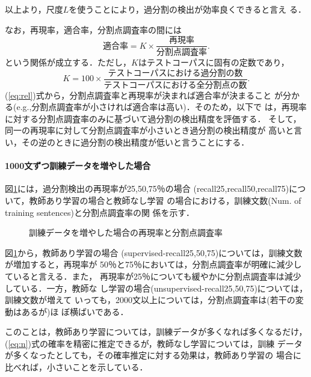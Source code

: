 以上より，尺度$L$を使うことにより，過分割の検出が効率良くできると言え
る．

なお，再現率，適合率，分割点調査率の間には
\begin{equation}
  \label{eq:rel}
  適合率  = K \times \frac{再現率}{分割点調査率}.
\end{equation}
という関係が成立する．ただし，$K$はテストコーパスに固有の定数であり，
\begin{displaymath}
K = 100 \times \frac{テストコーパスにおける過分割の数}{テストコーパスにおける全分割点の数}.
\end{displaymath}
(\ref{eq:rel})式から，分割点調査率と再現率が決まれば適合率が決まること
が分かる(e.g.,分割点調査率が小さければ適合率は高い)．そのため，以下で
は，再現率に対する分割点調査率のみに基づいて過分割の検出精度を評価する．
そして，同一の再現率に対して分割点調査率が小さいとき過分割の検出精度が
高いと言い，その逆のときに過分割の検出精度が低いと言うことにする．

\paragraph{1000文ずつ訓練データを増やした場合}

図\ref{fig:incr-exam}には，過分割検出の再現率が25,50,75％の場合
(recall25,recall50,recall75)について，教師あり学習の場合と教師なし学習
の場合における，訓練文数(Num. of training sentences)と分割点調査率の関
係を示す．


\begin{figure}[htbp]
  \begin{center}
\vspace{1mm}
\vspace{2mm}
    \caption{訓練データを増やした場合の再現率と分割点調査率}
    \label{fig:incr-exam}
  \end{center}
\end{figure}

図\ref{fig:incr-exam}から，教師あり学習の場合
(supervised-recall25,50,75)については，訓練文数が増加すると，再現率が
50％と75％においては，分割点調査率が明確に減少していると言える．また，
再現率が25％についても緩やかに分割点調査率は減少している．一方，教師な
し学習の場合(unsupervised-recall25,50,75)については，訓練文数が増えて
いっても，2000文以上については，分割点調査率は(若干の変動はあるが)ほ
ぼ横ばいである．

このことは，教師あり学習については，訓練データが多くなれば多くなるだけ，
(\ref{eq:n})式の確率を精密に推定できるが，教師なし学習については，訓練
データが多くなったとしても，その確率推定に対する効果は，教師あり学習の
場合に比べれば，小さいことを示している．

